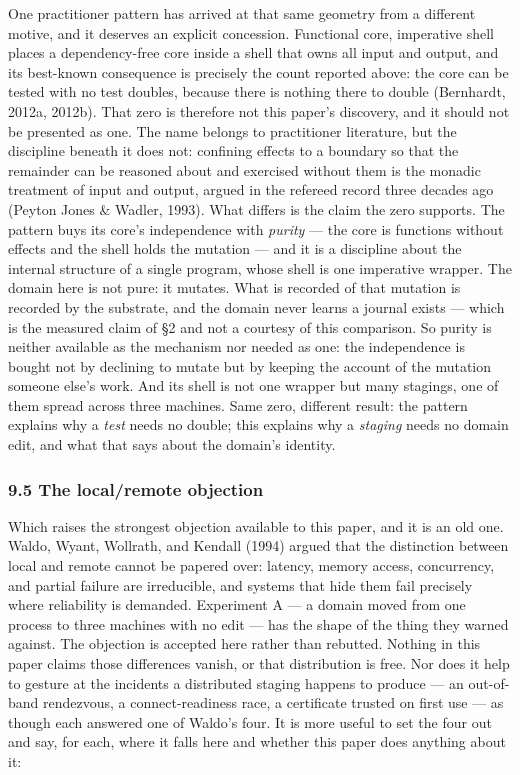 \documentclass[
]{article}
\begin{document}
One practitioner pattern has arrived at that same geometry from a
different motive, and it deserves an explicit concession. Functional
core, imperative shell places a dependency-free core inside a shell that
owns all input and output, and its best-known consequence is precisely
the count reported above: the core can be tested with no test doubles,
because there is nothing there to double (Bernhardt, 2012a, 2012b). That
zero is therefore not this paper's discovery, and it should not be
presented as one. The name belongs to practitioner literature, but the
discipline beneath it does not: confining effects to a boundary so that
the remainder can be reasoned about and exercised without them is the
monadic treatment of input and output, argued in the refereed record
three decades ago (Peyton Jones \& Wadler, 1993). What differs is the
claim the zero supports. The pattern buys its core's independence with
\emph{purity} --- the core is functions without effects and the shell
holds the mutation --- and it is a discipline about the internal
structure of a single program, whose shell is one imperative wrapper.
The domain here is not pure: it mutates. What is recorded of that
mutation is recorded by the substrate, and the domain never learns a
journal exists --- which is the measured claim of §2 and not a courtesy
of this comparison. So purity is neither available as the mechanism nor
needed as one: the independence is bought not by declining to mutate but
by keeping the account of the mutation someone else's work. And its
shell is not one wrapper but many stagings, one of them spread across
three machines. Same zero, different result: the pattern explains why a
\emph{test} needs no double; this explains why a \emph{staging} needs no
domain edit, and what that says about the domain's identity.

\subsubsection{9.5 The local/remote
objection}\label{the-localremote-objection}

Which raises the strongest objection available to this paper, and it is
an old one. Waldo, Wyant, Wollrath, and Kendall (1994) argued that the
distinction between local and remote cannot be papered over: latency,
memory access, concurrency, and partial failure are irreducible, and
systems that hide them fail precisely where reliability is demanded.
Experiment A --- a domain moved from one process to three machines with
no edit --- has the shape of the thing they warned against. The
objection is accepted here rather than rebutted. Nothing in this paper
claims those differences vanish, or that distribution is free. Nor does
it help to gesture at the incidents a distributed staging happens to
produce --- an out-of-band rendezvous, a connect-readiness race, a
certificate trusted on first use --- as though each answered one of
Waldo's four. It is more useful to set the four out and say, for each,
where it falls here and whether this paper does anything about it:
\end{document}
